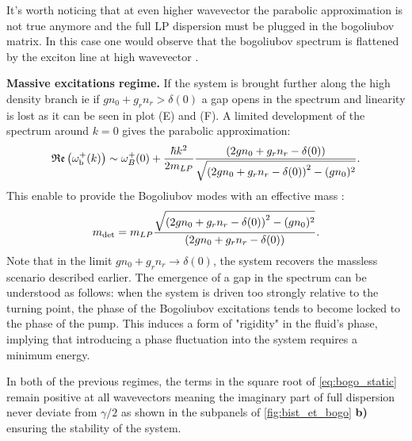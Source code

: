 It's worth noticing that at even higher wavevector the parabolic approximation is not true anymore and the full LP dispersion must be plugged in the bogoliubov matrix. In this case one would observe that the bogoliubov spectrum is flattened
by the exciton line at high wavevector \cite{I_frerot_PRX_2023}.

\bigskip

\textbf{Massive excitations regime.} If the system is brought further along the high density branch ie if $gn_0+g_rn_r>\delta(0)$ a gap opens in the spectrum and linearity is lost as it can be seen 
in plot (E) and (F). A limited development of the spectrum around $k=0$ gives the parabolic approximation:
\begin{equation}
    \mathfrak{Re}\left(\omega_{\mathrm{b}}^+(k)\right) \sim \omega^+_B(0) + \dfrac{\hbar k^2}{2m_{LP}}\dfrac{\left(2g n_0 + g_r n_r - \delta(0)\right)}{\sqrt{\left(2g n_0 + g_r n_r - \delta(0)\right)^2 - (g n_0)^2}}.
\end{equation}
This enable to provide the Bogoliubov modes with an effective mass :
\begin{equation}
    m_{\mathrm{det}}= m_{LP}\dfrac{\sqrt{\left(2g n_0 + g_r n_r - \delta(0)\right)^2 - (g n_0)^2}}{\left(2g n_0 + g_r n_r - \delta(0)\right)}.
\end{equation}
Note that in the limit $gn_0+g_rn_r\to \delta(0)$, the system recovers the massless scenario described earlier. 
The emergence of a gap in the spectrum can be understood as follows: when the system is driven too strongly relative to the turning point, the phase of the Bogoliubov excitations tends to become locked to the phase of the pump. 
This induces a form of "rigidity" in the fluid's phase, implying that introducing a phase fluctuation into the system requires a minimum energy.

\bigskip

In both of the previous regimes, the terms in the square root of \autoref{eq:bogo_static} remain positive at all wavevectors meaning the imaginary part of 
full dispersion never deviate from $\gamma/2$ as shown in the subpanels of \autoref{fig:bist_et_bogo} \textbf{b)} ensuring the stability of the system.

\bigskip


